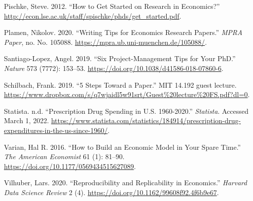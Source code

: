 \documentclass[
]{book}
\begin{document}
\leavevmode\hypertarget{ref-pischke_how_2012}{}%
Pischke, Steve. 2012. ``How to Get Started on Research in Economics?''
\url{http://econ.lse.ac.uk/staff/spischke/phds/get_started.pdf}.

\leavevmode\hypertarget{ref-plamen_writing_2020}{}%
Plamen, Nikolov. 2020. ``Writing Tips for Economics Research Papers.''
\emph{MPRA Paper}, no. No. 105088.
\url{https://mpra.ub.uni-muenchen.de/105088/}.

\leavevmode\hypertarget{ref-santiago-lopez_six_2019}{}%
Santiago-Lopez, Angel. 2019. ``Six Project-Management Tips for Your
PhD.'' \emph{Nature} 573 (7772): 153--53.
\url{https://doi.org/10.1038/d41586-018-07860-6}.

\leavevmode\hypertarget{ref-schilbach_5_2019}{}%
Schilbach, Frank. 2019. ``5 Steps Toward a Paper.'' MIT 14.192 guest
lecture.
\url{https://www.dropbox.com/s/q7wjaidl5w91srt/Guest\%20lecture\%20FS.pdf?dl=0}.

\leavevmode\hypertarget{ref-statista_prescription_nodate}{}%
Statista. n.d. ``Prescription Drug Spending in U.S. 1960-2020.''
\emph{Statista}. Accessed March 1, 2022.
\url{https://www.statista.com/statistics/184914/prescription-drug-expenditures-in-the-us-since-1960/}.

\leavevmode\hypertarget{ref-varian_how_2016}{}%
Varian, Hal R. 2016. ``How to Build an Economic Model in Your Spare
Time.'' \emph{The American Economist} 61 (1): 81--90.
\url{https://doi.org/10.1177/0569434515627089}.

\leavevmode\hypertarget{ref-vilhuber_reproducibility_2020}{}%
Vilhuber, Lars. 2020. ``Reproducibility and Replicability in
Economics.'' \emph{Harvard Data Science Review} 2 (4).
\url{https://doi.org/10.1162/99608f92.4f6b9e67}.

\backmatter
\end{document}
